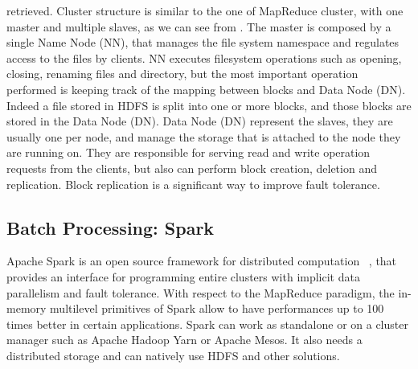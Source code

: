 retrieved. Cluster structure is similar to the one of MapReduce cluster,
with one master and multiple slaves, as we can see from .
The master is composed by a single Name Node (NN), that manages
the file system namespace and regulates access to the files by clients.
NN executes filesystem operations such as opening, closing, renaming
files and directory, but the most important operation performed is
keeping track of the mapping between blocks and Data Node (DN).
Indeed a file stored in HDFS is split into one or more blocks, and those
blocks are stored in the Data Node (DN). Data Node (DN) represent
the slaves, they are usually one per node, and manage the storage that
is attached to the node they are running on. They are responsible for
serving read and write operation requests from the clients, but also
can perform block creation, deletion and replication. Block replication
is a significant way to improve fault tolerance.

\subsection{Batch Processing: Spark}\label{sec:spark}
Apache Spark is an open source framework for distributed computation
~\cite{misc:ApacheSpark}, that provides an interface for programming entire clusters
with implicit data parallelism and fault tolerance. With respect to the MapReduce paradigm, the in-memory multilevel primitives of Spark allow to have performances up to 100 times better in certain applications. Spark can work as standalone or on a cluster manager such as Apache Hadoop Yarn or Apache Mesos. It also needs a distributed storage and can natively use HDFS and other solutions. 

